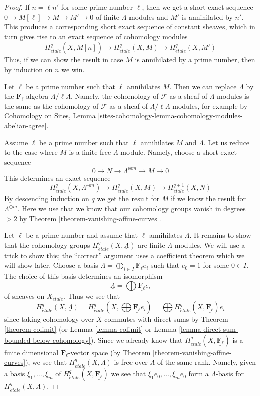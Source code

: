 \documentclass[10pt,a4paper]{amsart}
\theoremstyle{plain}
\theoremstyle{definition}
\theoremstyle{remark}
\numberwithin{equation}{subsection}
\def\etale{{\acute{e}tale}}
\begin{document}
\begin{proof}
If $n = \ell n'$ for some prime number $\ell$, then
we get a short exact sequence $0 \to M[\ell] \to M \to M' \to 0$
of finite $\Lambda$-modules and $M'$ is annihilated by $n'$.
This produces a corresponding short exact sequence of constant
sheaves, which in turn gives rise to an exact sequence
of cohomology modules
$$
H^q_\etale(X, \underline{M[n]}) \to
H^q_\etale(X, \underline{M}) \to
H^q_\etale(X, \underline{M'})
$$
Thus, if we can show the result in case $M$ is annihilated by
a prime number, then by induction on $n$ we win.

\medskip\noindent
Let $\ell$ be a prime number such that $\ell$ annihilates $M$.
Then we can replace $\Lambda$ by the $\mathbf{F}_\ell$-algebra
$\Lambda/\ell \Lambda$. Namely, the cohomology of $\mathcal{F}$
as a sheaf of $\Lambda$-modules is the same as the cohomology
of $\mathcal{F}$ as a sheaf of $\Lambda/\ell \Lambda$-modules,
for example by
Cohomology on Sites, Lemma
\ref{sites-cohomology-lemma-cohomology-modules-abelian-agree}.

\medskip\noindent
Assume $\ell$ be a prime number such that $\ell$ annihilates $M$
and $\Lambda$.
Let us reduce to the case where $M$ is a finite free $\Lambda$-module.
Namely, choose a short exact sequence
$$
0 \to N \to \Lambda^{\oplus m} \to M \to 0
$$
This determines an exact sequence
$$
H^q_\etale(X, \underline{\Lambda^{\oplus m}}) \to
H^q_\etale(X, \underline{M}) \to
H^{q + 1}_\etale(X, \underline{N})
$$
By descending induction on $q$ we get the result for $M$
if we know the result for $\Lambda^{\oplus m}$.
Here we use that we know that our cohomology groups
vanish in degrees $> 2$ by
Theorem \ref{theorem-vanishing-affine-curves}.

\medskip\noindent
Let $\ell$ be a prime number and assume that $\ell$ annihilates
$\Lambda$. It remains to show that the cohomology groups
$H^q_\etale(X, \underline{\Lambda})$ are finite $\Lambda$-modules.
We will use a trick to show this; the ``correct'' argument uses
a coefficient theorem which we will show later.
Choose a basis $\Lambda = \bigoplus_{i \in I} \mathbf{F}_\ell e_i$
such that $e_0 = 1$ for some $0 \in I$.
The choice of this basis determines an isomorphism
$$
\underline{\Lambda} = \bigoplus \underline{\mathbf{F}_\ell} e_i
$$
of sheaves on $X_\etale$. Thus we see that
$$
H^q_\etale(X, \underline{\Lambda}) =
H^q_\etale(X, \bigoplus \underline{\mathbf{F}_\ell} e_i) =
\bigoplus H^q_\etale(X, \underline{\mathbf{F}_\ell})e_i
$$
since taking cohomology over $X$ commutes with direct sums
by Theorem \ref{theorem-colimit}
(or Lemma \ref{lemma-colimit} or
Lemma \ref{lemma-direct-sum-bounded-below-cohomology}).
Since we already know that $H^q_\etale(X, \underline{\mathbf{F}_\ell})$
is a finite dimensional $\mathbf{F}_\ell$-vector space
(by Theorem \ref{theorem-vanishing-affine-curves}),
we see that $H^q_\etale(X, \underline{\Lambda})$
is free over $\Lambda$ of the same rank. Namely, given
a basis $\xi_1, \ldots, \xi_m$ of $H^q_\etale(X, \underline{\mathbf{F}_\ell})$
we see that $\xi_1 e_0, \ldots, \xi_m e_0$ form a $\Lambda$-basis for
$H^q_\etale(X, \underline{\Lambda})$.
\end{proof}
\end{document}
